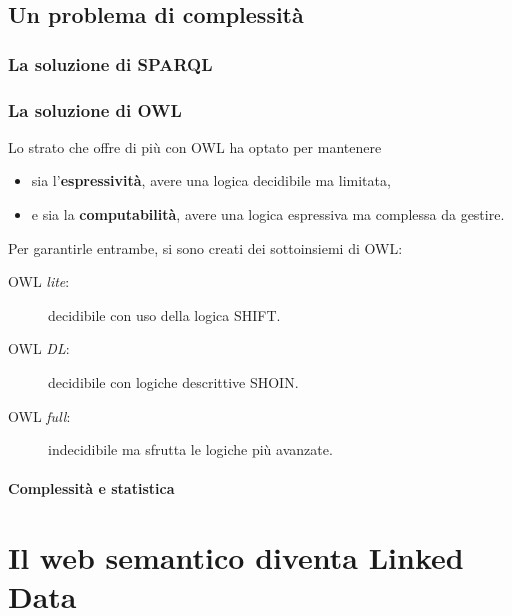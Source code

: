 		\subsection{Un problema di complessità}
			
			\subsubsection{La soluzione di SPARQL}
			
			\subsubsection{La soluzione di OWL}
				Lo strato che offre di più con OWL ha optato per mantenere
				\begin{itemize}[label={}]
					\item sia l'\textbf{espressività}, avere una logica decidibile ma limitata,
					\item e sia la \textbf{computabilità}, avere una logica espressiva ma complessa da gestire.
				\end{itemize}
				Per garantirle entrambe, si sono creati dei sottoinsiemi di OWL:
				\begin{description}
					\item[OWL \emph{lite}:] decidibile con uso della logica SHIFT.
					\item[OWL \emph{DL}:] decidibile con logiche descrittive SHOIN.
					\item[OWL \emph{full}:] indecidibile ma sfrutta le logiche più avanzate.
				\end{description}
				
				\paragraph{Complessità e statistica}		
				
		
	\section{Il web semantico diventa Linked Data}
		
